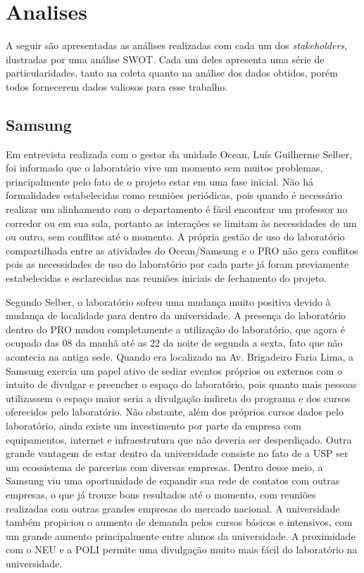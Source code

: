 \chapter{Analises}
\label{cha:analises}

A seguir são apresentadas as análises realizadas com cada um dos \textit{stakeholders}, ilustradas por uma análise SWOT. Cada um deles apresenta uma série de particularidades, tanto na coleta quanto na análise dos dados obtidos, porém todos fornecerem dados valiosos para esse trabalho.

\section{Samsung}

Em entrevista realizada com o gestor da unidade Ocean, Luís Guilherme Selber, foi informado que o laboratório vive um momento sem muitos problemas, principalmente pelo fato de o projeto estar em uma fase inicial. Não há formalidades estabelecidas como reuniões periódicas, pois quando é necessário realizar um alinhamento com o departamento é fácil encontrar um professor no corredor ou em sua sala, portanto as interações se limitam às necessidades de um ou outro, sem conflitos até o momento. A própria gestão de uso do laboratório compartilhada entre as atividades do Ocean/Samsung e o PRO não gera conflitos pois as necessidades de uso do laboratório por cada parte já foram previamente estabelecidas e esclarecidas nas reuniões iniciais de fechamento do projeto.

Segundo Selber, o laboratório sofreu uma mudança muito positiva devido à mudança de localidade para dentro da universidade. A presença do laboratório dentro do PRO mudou completamente a utilização do laboratório, que agora é ocupado das 08 da manhã até as 22 da noite de segunda a sexta, fato que não acontecia na antiga sede. Quando era localizado na Av. Brigadeiro Faria Lima, a Samsung exercia um papel ativo de sediar eventos próprios ou externos com o intuito de divulgar e preencher o espaço do laboratório, pois quanto mais pessoas utilizassem o espaço maior seria a divulgação indireta do programa e dos cursos oferecidos pelo laboratório. Não obstante, além dos próprios cursos dados pelo laboratório, ainda existe um investimento por parte da empresa com equipamentos, internet e infraestrutura que não deveria ser desperdiçado. Outra grande vantagem de estar dentro da universidade consiste no fato de a USP ser um ecossistema de parcerias com diversas empresas. Dentro desse meio, a Samsung viu uma oportunidade de expandir sua rede de contatos com outras empresas, o que já trouxe bons resultados até o momento, com reuniões realizadas com outras grandes empresas do mercado nacional. A universidade também propiciou o aumento de demanda pelos cursos básicos e intensivos, com um grande aumento principalmente entre alunos da universidade. A proximidade com o NEU e a POLI permite uma divulgação muito mais fácil do laboratório na universidade.

